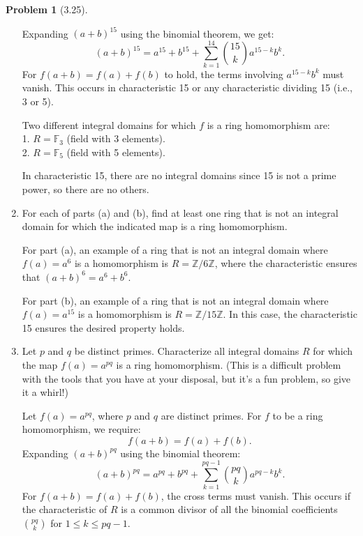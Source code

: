 \documentclass[12pt]{article}
\theoremstyle{definition}
\newtheorem{problem}{Problem}
\begin{document}
\begin{problem}[3.25]
\begin{enumerate}[label=(\alph*)]
\begin{solution}
            Expanding $(a + b)^{15}$ using the binomial theorem, we get:
            \[
            (a + b)^{15} = a^{15} + b^{15} + \sum_{k=1}^{14} \binom{15}{k}a^{15-k}b^k.
            \]
            For $f(a + b) = f(a) + f(b)$ to hold, the terms involving $a^{15-k}b^k$ must vanish. This occurs in characteristic 15 or any characteristic dividing 15 (i.e., 3 or 5).
            
            Two different integral domains for which $f$ is a ring homomorphism are:\\
            1. $R = \mathbb{F}_3$ (field with 3 elements).\\
            2. $R = \mathbb{F}_5$ (field with 5 elements).
            
            In characteristic 15, there are no integral domains since 15 is not a prime power, so there are no others.            
        \end{solution}

        \item For each of parts (a) and (b), find at least one ring that is not an 
        integral domain for which the indicated map is a ring homomorphism.

        \begin{solution}
            For part (a), an example of a ring that is not an integral domain where $f(a) = a^6$ is a homomorphism is $R = \mathbb{Z}/6\mathbb{Z}$, where the characteristic ensures that $(a + b)^6 = a^6 + b^6$.

            For part (b), an example of a ring that is not an integral domain where $f(a) = a^{15}$ is a homomorphism is $R = \mathbb{Z}/15\mathbb{Z}$. In this case, the characteristic 15 ensures the desired property holds.            
        \end{solution}
        \item Let $p$ and $q$ be distinct primes. Characterize all integral domains $R$ for which the map $f(a) = a^{pq}$
                is a ring homomorphism. (This is a difficult problem with the tools that you have at your disposal, but it's
                a fun problem, so give it a whirl!)
        
        \begin{solution}    
            Let $f(a) = a^{pq}$, where $p$ and $q$ are distinct primes. For $f$ to be a ring homomorphism, we require:
            \[
            f(a + b) = f(a) + f(b).
            \]
            Expanding $(a + b)^{pq}$ using the binomial theorem:
            \[
            (a + b)^{pq} = a^{pq} + b^{pq} + \sum_{k=1}^{pq-1} \binom{pq}{k}a^{pq-k}b^k.
            \]
            For $f(a + b) = f(a) + f(b)$, the cross terms must vanish. This occurs if the characteristic of $R$ is a common divisor of all the binomial coefficients $\binom{pq}{k}$ for $1 \leq k \leq pq-1$.
            

\end{solution}
\end{enumerate}
\end{problem}
\end{document}
